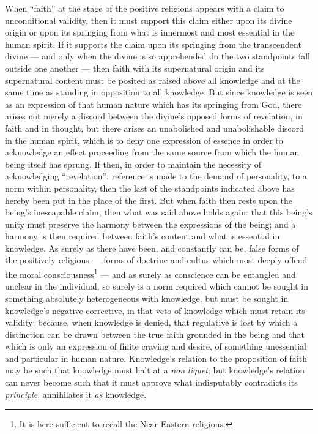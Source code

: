 \documentclass[12pt,a4paper]{book}
\begin{document}
When ``faith'' at the stage of the positive religions appears with a claim to
unconditional validity, then it must support this claim either upon its divine
origin or upon its springing from what is innermost and most essential in the
human spirit. If it supports the claim upon its springing from the
transcendent divine --- and only when the divine is so apprehended do the two
standpoints fall outside one another --- then faith with its supernatural
origin and its supernatural content must be posited as raised above all
knowledge and at the same time as standing in
\setcounter{footnote}{0}%
opposition to all knowledge. But since knowledge is seen as an expression of
that human nature which has its springing from God, there arises not merely a
discord between the divine's opposed forms of revelation, in faith and in
thought, but there arises an unabolished and unabolishable discord in the
human spirit, which is to deny one expression of essence in order to
acknowledge an effect proceeding from the same source from which the human
being itself has sprung. If then, in order to maintain the necessity of
acknowledging ``revelation'', reference is made to the demand of personality,
to a norm within personality, then the last of the standpoints indicated above
has hereby been put in the place of the first. But when faith then rests upon
the being's inescapable claim, then what was said above holds again: that this
being's unity must preserve the harmony between the expressions of the being;
and a harmony is then required between faith's content and what is essential
in knowledge. As surely as there have been, and constantly can be, false forms
of the positively religious --- forms of doctrine and cultus which most deeply
offend the moral consciousness\footnote{It is here sufficient to recall the
Near Eastern religions.} --- and as surely as conscience can be entangled and
unclear in the individual, so surely is a norm required which cannot be sought
in something absolutely heterogeneous with knowledge, but must be sought in
knowledge's negative corrective, in that veto of knowledge which must retain
its validity; because, when knowledge is denied, that regulative is lost by
which a distinction can be drawn between the true faith grounded in the being
and that which is only an expression of finite craving and desire, of
something unessential and particular in human nature. Knowledge's relation to
the proposition of faith may be such that knowledge must halt at a
\textit{non liquet}; but knowledge's relation can never become such that it
must approve what indisputably contradicts its \emph{principle}, annihilates
it \emph{as} knowledge.
\end{document}

